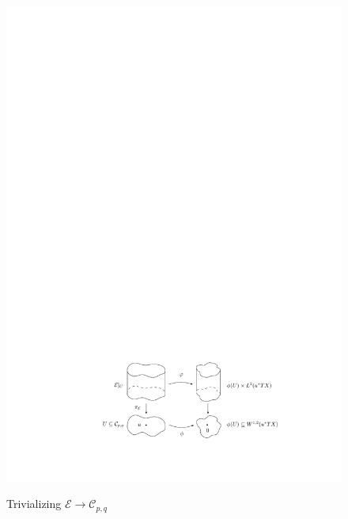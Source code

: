 \begin{figure}[tb]
\centering
\ \ \ \ \ \ \ \ \ \ \ \ \ \ \ \ \ \includegraphics[scale=1]{graphics/banach-bundle}
\caption{Trivializing $\mathcal E \rightarrow \mathcal C_{p,q}$}
\label{banach-bundle}
\end{figure}

